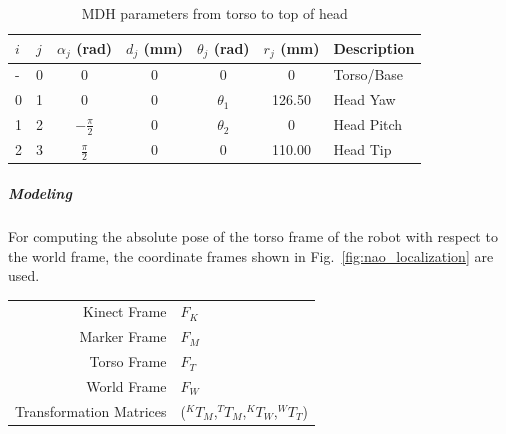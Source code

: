\begin{table}[H]
\centering
\caption{MDH parameters from torso to top of head}
\label{table:nao_mdh}
\begin{tabular}{|l|l|c|c|c|c|p{2cm}|}
\hline
  \textbf{$i$}  & \textbf{$j$}  & \textbf{$\alpha_j$ (rad)} & \textbf{$d_j$ (mm)} & \textbf{$\theta_j$ (rad)} & \textbf{$r_j$ (mm)} & \textbf{Description}
  \tabularnewline \hline
  - & 0 & 0 & 0 & 0 & 0 & Torso/Base
                                          \tabularnewline\hline
                                          
  0 & 1 & 0 & 0 & $\theta_1$ & 126.50 & Head Yaw
                                          \tabularnewline\hline
                       
  1 & 2 & $-\frac{\pi}{2}$ & 0 & $\theta_2$ & 0 & Head Pitch
                                          \tabularnewline\hline                    
  
  2 & 3 & $\frac{\pi}{2}$ & 0 & 0 & 110.00 & Head Tip
                                          \tabularnewline\hline
\end{tabular}
\end{table}

\subparagraph{Modeling}
For computing the absolute pose of the torso frame of the robot with respect to the world frame, the coordinate frames shown in Fig.~\ref{fig:nao_localization} are used.

\begin{tabular}{r l}
\centering
  Kinect Frame & $F_K$ \\ 
  Marker Frame & $F_M$ \\ 
  Torso Frame & $F_T$ \\ 
  World Frame & $F_W$ \\ 
  Transformation Matrices  & ($^{K}T_M$,$^{T}T_M$,$^{K}T_W$,$^{W}T_T$) \\
\end{tabular}

